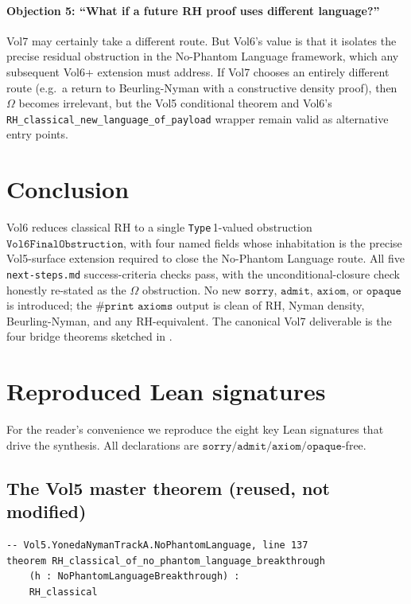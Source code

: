 \documentclass[11pt]{article}
\theoremstyle{plain}
\theoremstyle{definition}
\theoremstyle{remark}
\newcommand{\code}[1]{\texttt{#1}}
\newcommand{\Obs}{\Omega}
\begin{document}
\paragraph{Objection 5: ``What if a future RH proof uses different
language?''}
Vol7 may certainly take a different route.  But Vol6's value is
that it isolates the precise residual obstruction in the
No-Phantom Language framework, which any subsequent Vol6+
extension must address.  If Vol7 chooses an entirely different
route (e.g.\ a return to Beurling-Nyman with a constructive
density proof), then \(\Obs\) becomes irrelevant, but the
Vol5 conditional theorem and Vol6's
\code{RH\_classical\_new\_language\_of\_payload} wrapper remain
valid as alternative entry points.

\section{Conclusion}
\label{sec:conclusion}

Vol6 reduces classical RH to a single \code{Type}\,1-valued obstruction
\(\code{Vol6FinalObstruction}\), with four named fields whose
inhabitation is the precise Vol5-surface extension required to close
the No-Phantom Language route.  All five \code{next-steps.md}
success-criteria checks pass, with the unconditional-closure check
honestly re-stated as the \(\Obs\) obstruction.  No new
\(\code{sorry}\), \(\code{admit}\), \(\code{axiom}\), or
\(\code{opaque}\) is introduced; the \(\code{\#print axioms}\)
output is clean of RH, Nyman density, Beurling-Nyman, and any
RH-equivalent.  The canonical Vol7 deliverable is the four bridge
theorems sketched in .

\appendix

\section{Reproduced Lean signatures}
\label{appx:lean-sigs}

For the reader's convenience we reproduce the eight key Lean
signatures that drive the synthesis.  All declarations are
\(\code{sorry}/\code{admit}/\code{axiom}/\code{opaque}\)-free.

\subsection{The Vol5 master theorem (reused, not modified)}

\begin{lstlisting}
-- Vol5.YonedaNymanTrackA.NoPhantomLanguage, line 137
theorem RH_classical_of_no_phantom_language_breakthrough
    (h : NoPhantomLanguageBreakthrough) :
    RH_classical
\end{lstlisting}
\end{document}
